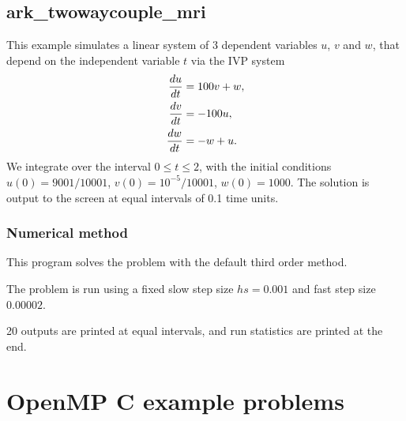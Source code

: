 \documentclass[letterpaper,10pt,english]{sphinxmanual}
\begin{document}
\section{ark\_twowaycouple\_mri}
\label{c_serial:id36}\label{c_serial:ark-twowaycouple-mri}
This example simulates a linear system of 3 dependent variables \(u\),
\(v\) and \(w\), that depend on the independent variable \(t\) via
the IVP system
\begin{gather}
\begin{split}\frac{du}{dt} &= 100 v + w, \\
\frac{dv}{dt} &= -100 u, \\
\frac{dw}{dt} &= -w + u.\end{split}\notag
\end{gather}
We integrate over the interval \(0 \le t \le 2\), with the initial
conditions \(u(0) = 9001/10001\), \(v(0) = 10^{-5}/10001\),
\(w(0)= 1000\).  The solution is output to the screen at equal intervals of
0.1 time units.


\subsection{Numerical method}
\label{c_serial:id37}
This program solves the problem with the default third order method.

The problem is run using a fixed slow step size \(hs=0.001\) and fast step
size \(0.00002\).

20 outputs are printed at equal intervals, and run statistics
are printed at the end.


\chapter{OpenMP C example problems}
\label{c_openmp:openmp-c}\label{c_openmp::doc}\label{c_openmp:openmp-c-example-problems}
\end{document}

